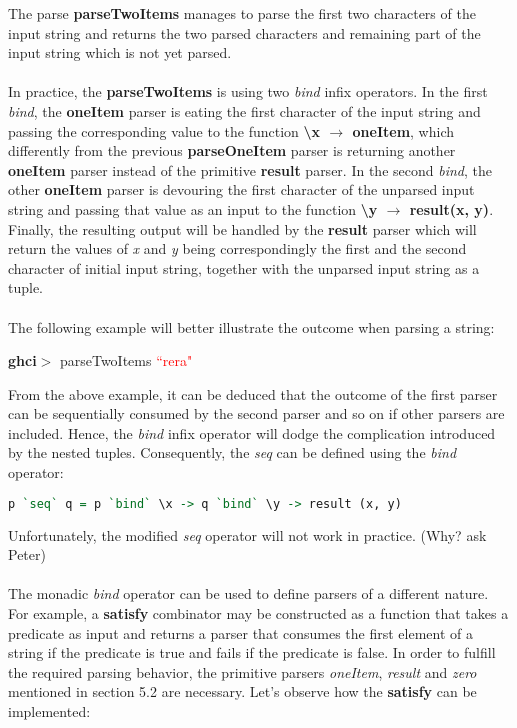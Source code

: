 \documentclass[a4paper, onecolumn]{article}
\begin{document}
    The parse \textbf{parseTwoItems} manages to parse the first two characters of the input string and returns the two parsed characters and remaining part of the input string which is not yet parsed. \\ \\
    In practice, the \textbf{parseTwoItems} is using two \textit{bind} infix operators. In the first \textit{bind}, the \textbf{oneItem} parser is eating the first character of the input string and passing the corresponding value to the function \textbf{\textbackslash x $\rightarrow$ oneItem}, which differently from the previous \textbf{parseOneItem} parser is returning another \textbf{oneItem} parser instead of the primitive \textbf{result} parser. In the second \textit{bind}, the  other \textbf{oneItem} parser is devouring the first character of the unparsed input string and passing that value as an input to the function \textbf{\textbackslash y $\rightarrow$ result(x, y)}. Finally, the resulting output will be handled by the \textbf{result} parser which will return the values of \textit{x} and \textit{y} being correspondingly the first and the second character of initial input string, together with the unparsed input string as a tuple. \\ \\ 
    The following example will better illustrate the outcome when parsing a string:
       \begin{center}
            \textbf{ghci$>$} parseTwoItems \textcolor{red}{``rera"} \\
            [((\textcolor{green}{`r'}, \textcolor{green}{`e'}), \textcolor{red}{``ra"})]
        \end{center}
        
    From the above example, it can be deduced that the outcome of the first parser can be sequentially consumed by the second parser and so on if other parsers are included. Hence, the \textit{bind} infix operator will dodge the complication introduced by the nested tuples. Consequently, the \textit{seq} can be defined using the \textit{bind} operator: 
    
    \begin{tcolorbox}
    \begin{lstlisting}[language=Haskell]
      p `seq` q = p `bind` \x -> q `bind` \y -> result (x, y)
    \end{lstlisting}
    \end{tcolorbox}
    
    Unfortunately, the modified \textit{seq} operator will not work in practice. (Why? ask Peter) \\ \\ 
    The monadic \textit{bind} operator can be used to define parsers of a different nature. For example, a \textbf{satisfy} combinator may be constructed as a function that takes a predicate as input and returns a parser that consumes the first element of a string if the predicate is true and fails if the predicate is false. In order to fulfill the required parsing behavior, the primitive parsers \textit{oneItem}, \textit{result} and \textit{zero} mentioned in section 5.2 are necessary. Let's observe how the \textbf{satisfy} can be implemented: 
    
\end{document}
